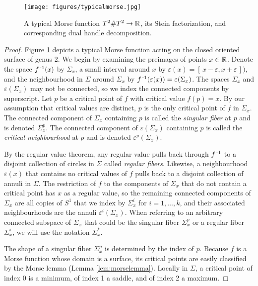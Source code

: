 \begin{figure}
	\caption{A typical Morse function $T^2\# T^2\to\mathbb{R}$, its Stein factorization, and corresponding dual handle decomposition.}
	\centering
	\texttt{[image: figures/typicalmorse.jpg]}
	\label{fig:typicalmorse}
\end{figure}

\begin{proof}
	Figure \ref{fig:typicalmorse} depicts a typical Morse function acting on the closed oriented surface of genus 2.
	We begin by examining the preimages of points $x\in\mathbb{R}$.
	Denote the space $f^{\,\text{-}1}(x)$ by $\Sigma_x$, a small interval around $x$ by $\varepsilon(x)=[\,x-\varepsilon,x+\varepsilon\,])$, and the neighbourhood in $\Sigma$ around $\Sigma_x$ by $f^{\,\text{-}1}(\varepsilon(x))=\varepsilon(\Sigma_x)$.
	The spaces $\Sigma_x$ and $\varepsilon(\Sigma_x)$ may not be connected, so we index the connected components by superscript.
	Let $p$ be a critical point of $f$ with critical value $f(p)=x$.
	By our assumption that critical values are distinct, $p$ is the only critical point of $f$ in $\Sigma_x$.
	The connected component of $\Sigma_x$ containing $p$ is called the \emph{singular fiber} at $p$ and is denoted $\Sigma_x^p$.
	The connected component of $\varepsilon(\Sigma_x)$ containing $p$ is called the \emph{critical neighbourhood} at $p$ and is denoted $\varepsilon^p(\Sigma_x)$.
	
	By the regular value theorem, any regular value pulls back through $f^{\,\text{-}1}$ to a disjoint collection of circles in $\Sigma$ called \emph{regular fibers}.
	Likewise, a neighbourhood $\varepsilon(x)$ that contains no critical values of $f$ pulls back to a disjoint collection of annuli in $\Sigma$.
	The restriction of $f$ to the components of $\Sigma_x$ that do not contain a critical point has $x$ as a regular value, so the remaining connected components of $\Sigma_x$ are all copies of $S^1$ that we index by $\Sigma_x^i$ for $i=1,\dots,k$, and their associated neighbourhoods are the annuli $\varepsilon^i(\Sigma_x)$.
	When referring to an arbitrary connected subspace of $\Sigma_x$ that could be the singular fiber $\Sigma_x^p$ or a regular fiber $\Sigma_x^i$, we will use the notation $\Sigma_x^*$.
	
	The shape of a singular fiber $\Sigma_x^p$ is determined by the index of $p$.
	Because $f$ is a Morse function whose domain is a surface, its critical points are easily classified by the Morse lemma (Lemma \ref{lem:morselemma}).
	Locally in $\Sigma$, a critical point of index 0 is a minimum, of index 1 a saddle, and of index 2 a maximum.
	

\end{proof}
